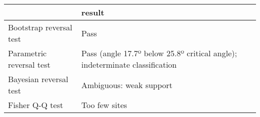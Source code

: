 \begin{tabular}{ll}
\toprule
{} &                                                                       result \\
\midrule
Bootstrap reversal test  &                                                                         Pass \\
Parametric reversal test &  Pass (angle 17.7º below 25.8º critical angle); indeterminate classification \\
Bayesian reversal test   &                                                      Ambiguous: weak support \\
Fisher Q-Q test          &                                                                Too few sites \\
\bottomrule
\end{tabular}
